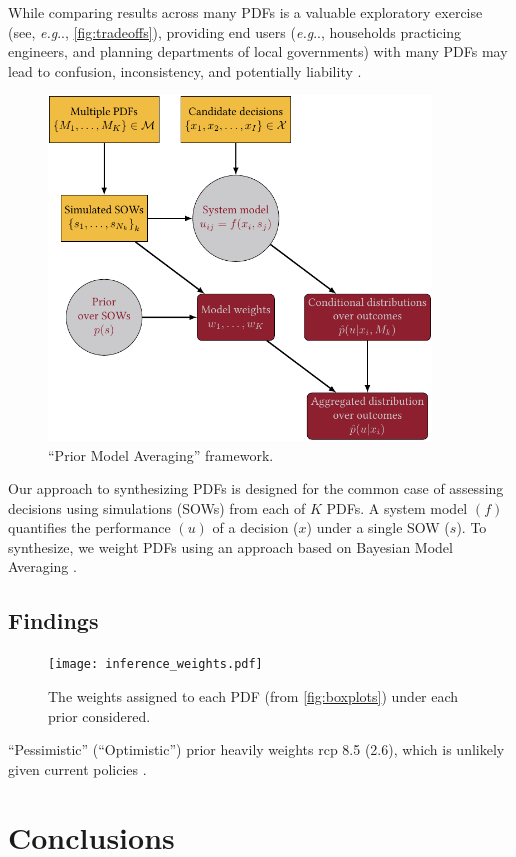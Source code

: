 \documentclass[12pt]{article}
\makeatletter
\DeclareRobustCommand\onedot{\futurelet\@let@token\@onedot}
\def\@onedot{\ifx\@let@token.\else.\null\fi\xspace}
\def\eg{\emph{e.g}\onedot} \def\Eg{\emph{E.g}\onedot}
\DeclareRobustCommand\onedot{\futurelet\@let@token\@onedot}
\def\@onedot{\ifx\@let@token.\else.\null\fi\xspace}
\def\eg{\emph{e.g}\onedot} \def\Eg{\emph{E.g}\onedot}
\makeatother
\begin{document}
While comparing results across many PDFs is a valuable exploratory exercise (see, \eg, \cref{fig:tradeoffs}), providing end users (\eg, households practicing engineers, and planning departments of local governments) with many PDFs may lead to confusion, inconsistency, and potentially liability \citep[see][]{schneider_dangerous:2001,schneider_scenarios:2002}.
\begin{figure}
    \centering
    \includegraphics[width=4in]{bayes-rdm.pdf}
    \caption{
        ``Prior Model Averaging'' framework.
    }\label{fig:flowchart}
\end{figure}
Our approach to synthesizing PDFs is designed for the common case of assessing decisions using simulations (SOWs) from each of $K$ PDFs.
A system model $(f)$ quantifies the performance $(u)$ of a decision ($x$) under a single SOW ($s$).
To synthesize, we weight PDFs using an approach based on Bayesian Model Averaging \citep{wong_surge:2018,Yao:2018bu}.

\subsection{Findings}

\begin{figure}
    \centering
    \texttt{[image: inference\_weights.pdf]}
    \caption{
        The weights assigned to each PDF (from \cref{fig:boxplots}) under each prior considered.
    }
\end{figure}
``Pessimistic'' (``Optimistic'') prior heavily weights \gls{rcp} 8.5 (2.6), which is unlikely given current policies \citep{hausfather_scenarios:2020}.

\section{Conclusions}\label{sec:conclusions}
\end{document}
